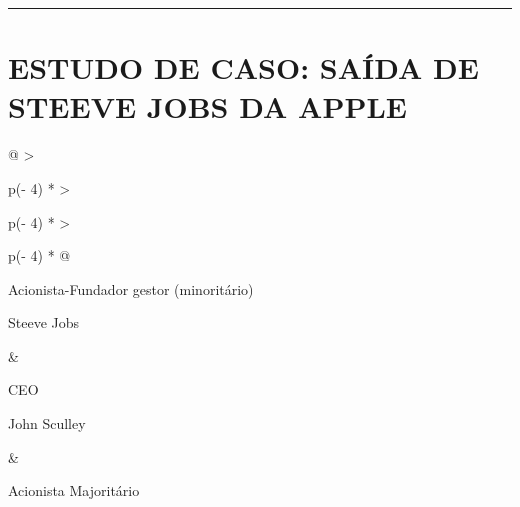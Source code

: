 \documentclass[
]{book}
\begin{document}
\begin{center}\rule{0.5\linewidth}{0.5pt}\end{center}

\section{ESTUDO DE CASO: SAÍDA DE STEEVE JOBS DA APPLE}\label{estudo-de-caso-sauxedda-de-steeve-jobs-da-apple}

\begin{longtable}[]{@{}
  >{\raggedright\arraybackslash}p{(\columnwidth - 4\tabcolsep) * }
  >{\raggedright\arraybackslash}p{(\columnwidth - 4\tabcolsep) * }
  >{\raggedright\arraybackslash}p{(\columnwidth - 4\tabcolsep) * }@{}}
\toprule\noalign{}
\begin{minipage}[b]{\linewidth}\raggedright
Acionista-Fundador gestor (minoritário)

Steeve Jobs
\end{minipage} & \begin{minipage}[b]{\linewidth}\raggedright
CEO

John Sculley
\end{minipage} & \begin{minipage}[b]{\linewidth}\raggedright
Acionista Majoritário


\end{minipage}
\end{longtable}
\end{document}
